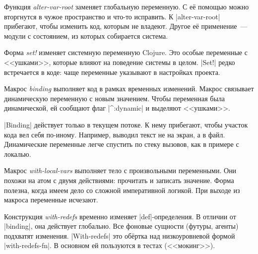 Функция \emph{alter-var-root} заменяет глобальную переменную. С е\"{е} помощью можно
вторгнутся в чужое пространство и что-то исправить. К \spverb|alter-var-root|
прибегают, чтобы изменить код, которым не владеют. Другое е\"{е} применение~---
модули с состоянием, из которых собирается система.

Форма \emph{set!} изменяет системную переменную Clojure. Это особые переменные с
<<ушками>>, которые влияют на поведение системы в целом. \spverb|Set!| редко
встречается в коде: чаще переменные указывают в настройках проекта.

Макрос \emph{binding} выполняет код в рамках временных изменений. Макрос
связывает динамическую переменную с новым значением. Чтобы переменная была
динамической, ей сообщают флаг \spverb|^:dynamic| и выделяют <<ушками>>.

\spverb|Binding| действует только в текущем потоке. К нему прибегают, чтобы
участок кода вел себя по-иному. Например, выводил текст не на экран, а в
файл. Динамические переменные легче спустить по стеку вызовов, как в примере с
локалью.

Макрос \emph{with-local-vars} выполняет тело с произвольными переменными. Они
похожи на атом с двумя действиями: прочитать и записать значение. Форма полезна,
когда имеем дело со сложной императивной логикой. При выходе из макроса
переменные исчезают.

Конструкция \emph{with-redefs} временно изменяет \spverb|def|-определения. В
отличии от \spverb|binding|, она действует глобально. Все фоновые сущности
(футуры, агенты) подхватят изменения. \spverb|With-redefs| это об\"{е}ртка над
низкоуровневой формой \spverb|with-redefs-fn|. В основном ей пользуются в тестах
(<<мокинг>>).
